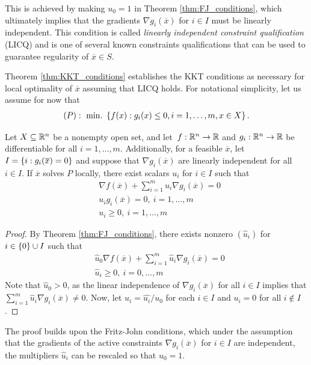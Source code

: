 This is achieved by making $u_0 = 1$ in Theorem \ref{thm:FJ_conditions}, which ultimately implies that the gradients $\nabla g_i(\overline{x})$ for $i \in I$ must be linearly independent. This condition is called \emph{linearly independent constraint qualification} (LICQ) and is one of several known constraints qualifications that can be used to guarantee regularity of $\overline{x} \in S$. 

Theorem \ref{thm:KKT_conditions} establishes the KKT conditions as necessary for local optimality of $\overline{x}$ assuming that LICQ holds. For notational simplicity, let us assume for now that \begin{align*}
		(P) :~ \mathop{\text{min.~}}\left\{ f(x) : g_i(x) \leq 0, i=1,\dots, m, x \in X \right \}. 	
 	\end{align*}
%
\begin{theorem} \label{thm:KKT_conditions}
Let $X \subseteq \mathbb{R}^n$ be a nonempty open set, and let \,$f:\mathbb{R}^n \rightarrow \mathbb{R}$ and $g_i:\mathbb{R}^n \rightarrow \mathbb{R}$ be differentiable for all $i = 1, \dots,m$. Additionally, for a feasible $\overline{x}$, let $I = \left\{ i : g_i(\overline{x}) = 0 \right \}$ and suppose that $\nabla g_i(\overline{x})$ are linearly\hspace{-1pt} independent for all $i \in I$. If $\overline{x}$ solves $P$ locally, there exist scalars $u_i$ for $i \in I$ such that
\begin{align*}
& \nabla f(\overline{x}) + \sum_{i=1}^m u_i \nabla g_i(\overline{x}) = 0\\
& u_i g_i(\overline{x}) = 0, \ i = 1,\dots, m\\
& u_i \geq 0, \ i = 1, \dots, m 
\end{align*}
%
\end{theorem}
%
\begin{proof}
By Theorem \ref{thm:FJ_conditions}, there exists nonzero $(\hat{u}_i)$ for $i \in \left\{ 0 \right \} \cup I$ such that 
\begin{align*} 
& \hat{u}_0 \nabla f(\overline{x}) + \sum_{i=1}^m \hat{u}_i \nabla g_i(\overline{x}) = 0 \\ 
& \hat{u}_i \geq 0, \ i = 0, \dots, m
\end{align*}
Note that $\hat{u}_0 > 0$, as the linear independence of $\nabla g_i(\overline{x})$ for all $i \in I$ implies that $\sum_{i=1}^m \hat{u}_i \nabla g_i(\overline{x}) \neq 0$. Now, let $u_i = \hat{u_i}/u_0$ for each $i \in I$ and $u_i = 0$ for all $i \not\in I$. 
\end{proof} 
%
The proof builds upon the Fritz-John conditions, which under the assumption that the gradients of the active constraints $\nabla g_i (\overline{x})$ for $i \in I$ are independent, the multipliers $\hat{u}_i$ can be rescaled so that $u_0 = 1$.

